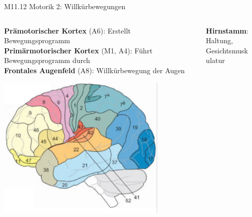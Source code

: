 \documentclass{beamer}
\begin{document}
\begin{frame}{M11.12 Motorik 2: Willkürbewegungen} 

\begin{columns}[c]

\begin{column}{5cm}

\textbf{Prämotorischer Kortex} (A6): Erstellt Bewegungsprogramm \\
\textbf{Primärmotorischer Kortex} (M1, A4): Führt Bewegungsprogramm durch\\ 
\textbf{Frontales Augenfeld} (A8): Willkürbewegung der Augen \\


\begin{center}
    \includegraphics[width=0.8\textwidth]{cortex.png}
\end{center}



\end{column}

\pause

\begin{column}{6.5cm}

\begin{columns}[c]
\begin{column}{4cm}

\textbf{Hirnstamm}: Haltung, Gesichtsmuskulatur 


\end{column}

\begin{column}{2.5cm}



\end{column}
\end{columns}
\end{column}
\end{columns}
\end{frame}
\end{document}
